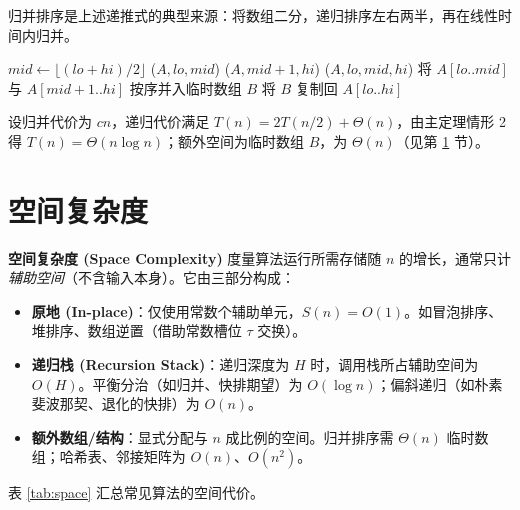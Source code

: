 归并排序是上述递推式的典型来源：将数组二分，递归排序左右两半，再在线性时间内归并。

\begin{algorithm}[H]
\caption{归并排序 (Merge Sort)}
\begin{algorithmic}[1]
        \State \Return {}
    \EndIf
    \State $mid \gets \lfloor (lo+hi)/2 \rfloor$
    \State {}($A, lo, mid$) 
    \State {}($A, mid+1, hi$) 
    \State {}($A, lo, mid, hi$) 
\EndProcedure
{}
    \State 将 $A[lo..mid]$ 与 $A[mid+1..hi]$ 按序并入临时数组 $B$
    \State 将 $B$ 复制回 $A[lo..hi]$
\EndProcedure
\end{algorithmic}
\end{algorithm}

设归并代价为 $cn$，递归代价满足 $T(n)=2T(n/2)+\Theta(n)$，由主定理情形 2 得 $T(n)=\Theta(n\log n)$；额外空间为临时数组 $B$，为 $\Theta(n)$（见第 \ref{sec:space} 节）。

\section{空间复杂度}
\label{sec:space}

\textbf{空间复杂度 (Space Complexity)} 度量算法运行所需存储随 $n$ 的增长，通常只计\emph{辅助空间}（不含输入本身）。它由三部分构成：

\begin{itemize}
    \item \textbf{原地 (In-place)}：仅使用常数个辅助单元，$S(n)=O(1)$。如冒泡排序、堆排序、数组逆置（借助常数槽位 $\tau$ 交换）。
    \item \textbf{递归栈 (Recursion Stack)}：递归深度为 $H$ 时，调用栈所占辅助空间为 $O(H)$。平衡分治（如归并、快排期望）为 $O(\log n)$；偏斜递归（如朴素斐波那契、退化的快排）为 $O(n)$。
    \item \textbf{额外数组/结构}：显式分配与 $n$ 成比例的空间。归并排序需 $\Theta(n)$ 临时数组；哈希表、邻接矩阵为 $O(n)$、$O(n^2)$。
\end{itemize}

表 \ref{tab:space} 汇总常见算法的空间代价。

